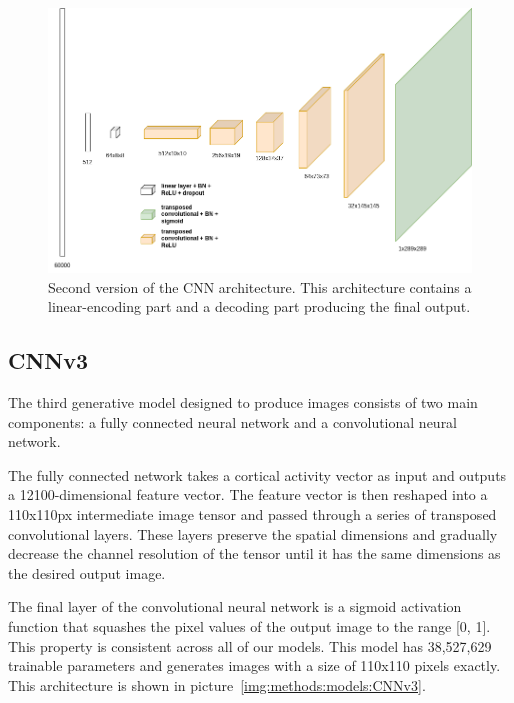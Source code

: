 \begin{figure}[H]\centering
\includegraphics[width=140mm]{img/cnnv2.drawio.png}
\caption{Second version of the CNN architecture. This architecture contains a linear-encoding part and a decoding part producing the final output.}
\label{img:methods:models:CNNv2}
\end{figure}


\subsection{CNNv3}
\label{methods:models:CNNv3}
The third generative model designed to produce images consists of two main components: a fully connected neural network and a convolutional neural network.

The fully connected network takes a cortical activity vector as input and outputs a 12100-dimensional feature vector. The feature vector is then reshaped into a 110x110px intermediate image tensor and passed through a series of transposed convolutional layers. These layers preserve the spatial dimensions and gradually decrease the channel resolution of the tensor until it has the same dimensions as the desired output image. 

The final layer of the convolutional neural network is a sigmoid activation function that squashes the pixel values of the output image to the range [0, 1]. This property is consistent across all of our models. This model has 38,527,629 trainable parameters and generates images with a size of 110x110 pixels exactly. This architecture is shown in picture~\ref{img:methods:models:CNNv3}.

